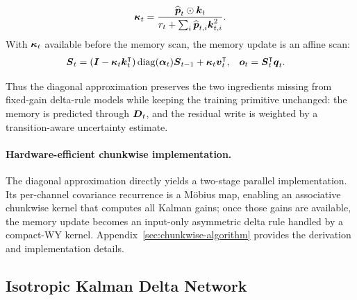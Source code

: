 \documentclass{article} %
\begin{document}
\begin{tcolorbox}
\begin{equation}
  \boldsymbol{\kappa}_t
  =
  \frac{\widehat{\boldsymbol{p}}_t\odot\boldsymbol{k}_t}
  {r_t+\sum_i \widehat{\boldsymbol{p}}_{t,i}\boldsymbol{k}_{t,i}^2}.
\label{eq:kla-box-gain}
\end{equation}
With $\boldsymbol{\kappa}_t$ available before the memory scan, the memory update is an affine scan:
\begin{equation}
\begin{aligned}
  \boldsymbol{S}_t
  &=
  (\boldsymbol{I}-\boldsymbol{\kappa}_t\boldsymbol{k}_t^{\intercal})\operatorname{diag}(\boldsymbol{\alpha}_t)\boldsymbol{S}_{t-1}
  +\boldsymbol{\kappa}_t\boldsymbol{v}_t^{\intercal},
  &
  \boldsymbol{o}_t &= \boldsymbol{S}_t^{\intercal}\boldsymbol{q}_t .
\end{aligned}
\label{eq:kla-box-memory}
\end{equation}
\end{tcolorbox}

Thus the diagonal approximation preserves the two ingredients missing from fixed-gain
delta-rule models while keeping the training primitive unchanged: the memory is predicted
through $\boldsymbol{D}_t$, and the residual write is weighted by a transition-aware uncertainty
estimate.

\paragraph{Hardware-efficient chunkwise implementation.}
The diagonal approximation directly yields a two-stage parallel implementation. Its per-channel
covariance recurrence is a M\"obius map, enabling an associative chunkwise kernel that computes
all Kalman gains; once those gains are available, the memory update becomes an input-only
asymmetric delta rule handled by a compact-WY kernel. Appendix~\ref{sec:chunkwise-algorithm}
provides the derivation and implementation details.

\subsection{Isotropic Kalman Delta Network}
\label{sec:isotropic-kdn}
\end{document}
